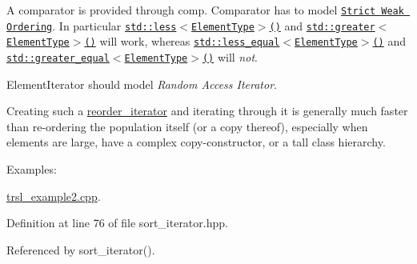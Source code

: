 A comparator is provided through {\ttfamily comp}. {\ttfamily Comparator} has to model \href{http://www.sgi.com/tech/stl/StrictWeakOrdering.html}{\tt Strict Weak Ordering}. In particular \href{http://www.sgi.com/tech/stl/less.html}{\tt {\ttfamily std::less$<$ElementType$>$()}} and \href{http://www.sgi.com/tech/stl/greater.html}{\tt {\ttfamily std::greater$<$ElementType$>$()}} will work, whereas \href{http://www.sgi.com/tech/stl/less_equal.html}{\tt {\ttfamily std::less\_\-equal$<$ElementType$>$()}} and \href{http://www.sgi.com/tech/stl/greater_equal.html}{\tt {\ttfamily std::greater\_\-equal$<$ElementType$>$()}} will {\itshape not\/}.

{\ttfamily ElementIterator} should model {\itshape Random Access Iterator\/}.

Creating such a \hyperlink{classtrsl_1_1reorder__iterator}{reorder\_\-iterator} and iterating through it is generally much faster than re-\/ordering the population itself (or a copy thereof), especially when elements are large, have a complex copy-\/constructor, or a tall class hierarchy. \begin{Desc}
\item[Examples: ]\par
\hyperlink{trsl__example2_8cpp-example}{trsl\_\-example2.cpp}.\end{Desc}


Definition at line 76 of file sort\_\-iterator.hpp.

Referenced by sort\_\-iterator().